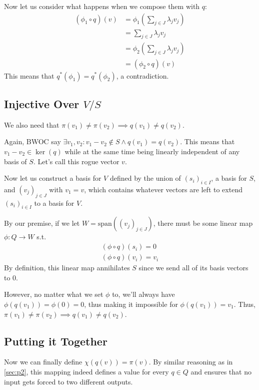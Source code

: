 \documentclass[12pt]{article}
\begin{document}
Now let us consider what happens when we compose them with $q$:
\begin{align*}
  (\phi_1 \circ q)(v)
  &= \phi_1\left(\sum_{j \in J} \lambda_j v_j\right) \\
  &= \sum_{j \in J} \lambda_j v_j \\
  &= \phi_2\left(\sum_{j \in J} \lambda_j v_j\right) \\
  &= (\phi_2 \circ q)(v)
\end{align*}
This means that $q^*(\phi_1)=q^*(\phi_2)$, a contradiction.

\pagebreak

\subsection{Injective Over \texorpdfstring{$V/S$}{V/S}}

We also need that $\pi(v_1) \ne \pi(v_2) \implies q(v_1) \ne q(v_2)$.

Again, BWOC say $\exists v_1, v_2: v_1 - v_2 \notin S \land q(v_1)=q(v_2)$.
This means that $v_1 - v_2 \in \ker(q)$ while at the same time
being linearly independent of any basis of $S$.
Let's call this rogue vector $v$.

Now let us construct a basis for $V$ defined by the union of $(s_i)_{i \in I}$,
a basis for $S$, and $(v_j)_{j \in J}$ with $v_1=v$, which contains
whatever vectors are left to extend $(s_i)_{i \in I}$ to a basis for $V$.

By our premise, if we let $W=\text{span}((v_j)_{j \in J})$,
there must be some linear map $\phi: Q \to W$ s.t.
\begin{gather*}
  (\phi \circ q)(s_i)=0 \\
  (\phi \circ q)(v_i)=v_i
\end{gather*}
By definition, this linear map annihilates $S$ since we send all of its
basis vectors to $0$.

However, no matter what we set $\phi$ to, we'll always have $\phi(q(v_1))=\phi(0)=0$,
thus making it impossible for $\phi(q(v_1))=v_1$.
Thus, $\pi(v_1) \ne \pi(v_2) \implies q(v_1) \ne q(v_2)$.

\subsection{Putting it Together}

Now we can finally define $\chi(q(v))=\pi(v)$.
By similar reasoning as in \ref{sec:p2}, this mapping indeed defines
a value for every $q \in Q$ and ensures that no input gets forced
to two different outputs.
\end{document}
